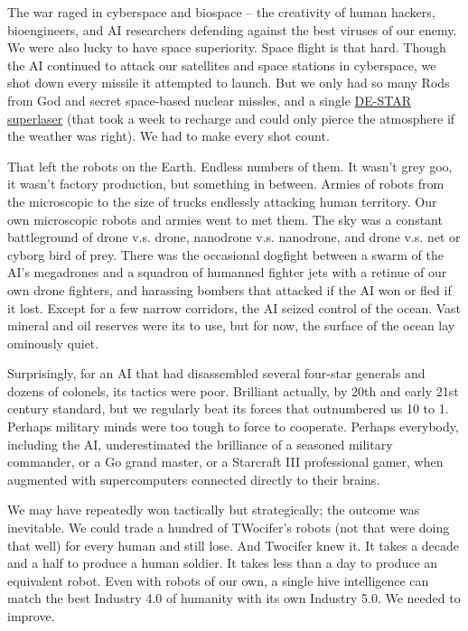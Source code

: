 \documentclass{report}  %
\begin{document}
The war raged in cyberspace and biospace – the creativity of human hackers, bioengineers, and AI researchers defending against the best viruses of our enemy. We were also lucky to have space superiority. Space flight is that hard. Though the AI continued to attack our satellites and space stations in cyberspace, we shot down every missile it attempted to launch. But we only had so many Rods from God and secret space-based nuclear missles, and a single \href{http://digitalcommons.calpoly.edu/stat\_fac/34/}{DE-STAR superlaser} (that took a week to recharge and could only pierce the atmosphere if the weather was right). We had to make every shot count.

That left the robots on the Earth. Endless numbers of them. It wasn’t grey goo, it wasn’t factory production, but something in between. Armies of robots from the microscopic to the size of trucks endlessly attacking human territory. Our own microscopic robots and armies went to met them. The sky was a constant battleground of drone v.s. drone, nanodrone v.s. nanodrone, and drone v.s. net or cyborg bird of prey. There was the occasional dogfight between a swarm of the AI’s megadrones and a squadron of humanned fighter jets with a retinue of our own drone fighters, and harassing bombers that attacked if the AI won or fled if it lost. Except for a few narrow corridors, the AI seized control of the ocean. Vast mineral and oil reserves were its to use, but for now, the surface of the ocean lay ominously quiet.

Surprisingly, for an AI that had disassembled several four-star generals and dozens of colonels, its tactics were poor. Brilliant actually, by 20th and early 21st century standard, but we regularly beat its forces that outnumbered us 10 to 1. Perhaps military minds were too tough to force to cooperate. Perhaps everybody, including the AI, underestimated the brilliance of a seasoned military commander, or a Go grand master, or a Starcraft III professional gamer, when augmented with supercomputers connected directly to their brains.

We may have repeatedly won tactically but strategically; the outcome was inevitable. We could trade a hundred of TWocifer's robots (not that were doing that well) for every human and still lose. And Twocifer knew it. It takes a decade and a half to produce a human soldier. It takes less than a day to produce an equivalent robot. Even with robots of our own, a single hive intelligence can match the best Industry 4.0 of humanity with its own Industry 5.0. We needed to improve.
\end{document}
